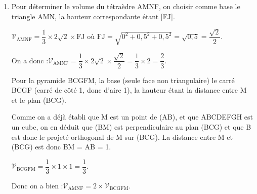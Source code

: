 \begin{enumerate}
\begin{enumerate}
			$0 - 0 + d = 0 \iff d = 0$.

			Finalement, une équation de (AMN) est $y - z = 0$.

			En testant l'appartenance de J à (AMN) :\quad $\begin{aligned}[t] y_{\mathrm{J}} - z_{\mathrm{J}} &= 0,5 - 0,5\\ &= 0
			\end{aligned}$

			Les coordonnées de J vérifient l'équation du plan, donc J appartient au plan (AMN).

			Comme $\vectt{FJ}$ est orthogonal au plan et que J est dans le plan, J est bien le projeté orthogonal de F sur (AMN).
		\end{enumerate}

		\item Pour déterminer le volume du tétraèdre AMNF, on choisir comme base le triangle AMN, la hauteur correspondante étant [FJ].

		$\mathcal{V}_{\mathrm{AMNF}} = \dfrac{1}{3} \times 2\sqrt{2} \times \mathrm{FJ}$ \quad où \quad $\mathrm{FJ} = \sqrt{0^2 + 0,5^2 + 0,5^2} = \sqrt{0,5} = \dfrac{\sqrt{2}}{2}$.

		On a donc :\quad $\mathcal{V}_{\mathrm{AMNF}} = \dfrac{1}{3} \times 2\sqrt{2} \times \dfrac{\sqrt{2}}{2} = \dfrac{1}{3} \times 2 = \dfrac{2}{3}$.

		Pour la pyramide BCGFM, la base (seule face non triangulaire) le carré BCGF (carré de côté 1, donc d'aire 1), la hauteur étant la distance entre M et le plan (BCG).

		Comme on a déjà établi que M est un point de (AB), et que ABCDEFGH est un cube, on en déduit que (BM) est perpendiculaire au plan (BCG) et que B est donc le projeté orthogonal de M sur (BCG). La distance entre M et (BCG) est donc BM = AB = 1.

		$\mathcal{V}_{\mathrm{BCGFM}} = \dfrac{1}{3} \times 1 \times 1 = \dfrac{1}{3}$.

		Donc on a bien :\quad $\mathcal{V}_{\mathrm{AMNF}} = 2 \times \mathcal{V}_{\mathrm{BCGFM}}$.
	\end{enumerate}

	\bigskip
